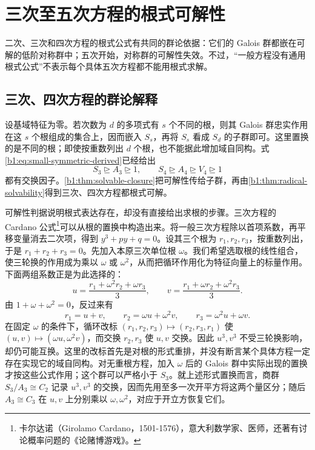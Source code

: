 
\section{三次至五次方程的根式可解性}
\label{b1:sec:2103}

二次、三次和四次方程的根式公式有共同的群论依据：它们的 Galois 群都嵌在可解的低阶对称群中；五次开始，对称群的可解性失效。不过，“一般方程没有通用根式公式”不表示每个具体五次方程都不能用根式求解。

%
%

\subsection{三次、四次方程的群论解释}
\label{b1:subsec:2103:01}

设基域特征为零。若次数为 \(d\) 的多项式有 \(s\) 个不同的根，则其 Galois 群忠实作用在这 \(s\) 个根组成的集合上，因而嵌入 \(S_s\)，再将 \(S_s\) 看成 \(S_d\) 的子群即可。这里置换的是不同的根；即使按重数列出 \(d\) 个根，也不能据此增加域自同构。式\eqref{b1:eq:small-symmetric-derived}已经给出
\[
	S_3\trianglerighteq A_3\trianglerighteq1, \qquad S_4\trianglerighteq A_4\trianglerighteq V_4\trianglerighteq1
\]
都有交换因子。\cref{b1:thm:solvable-closure}把可解性传给子群，再由\cref{b1:thm:radical-solvability}得到三次、四次方程都根式可解。

\ProseParagraphBreak
可解性判据说明根式表达存在，却没有直接给出求根的步骤。三次方程的 Cardano 公式\footnote{卡尔达诺（Girolamo Cardano，1501-1576），意大利数学家、医师，还著有讨论概率问题的《论赌博游戏》。}可以从根的置换中构造出来。将一般三次方程除以首项系数，再平移变量消去二次项，得到 \(y^3+py+q=0\)。设其三个根为 \(r_1,r_2,r_3\)，按重数列出，于是 \(r_1+r_2+r_3=0\)。先加入本原三次单位根 \(\omega\)。我们希望选取根的线性组合，使三轮换的作用成为乘以 \(\omega\) 或 \(\omega^2\)，从而把循环作用化为特征向量上的标量作用。下面两组系数正是为此选择的：
\[
	u=\frac{r_1+\omega^2r_2+\omega r_3}{3},\qquad v=\frac{r_1+\omega r_2+\omega^2r_3}{3}.
\]
由 \(1+\omega+\omega^2=0\)，反过来有
\[
	r_1=u+v,\qquad r_2=\omega u+\omega^2v,\qquad r_3=\omega^2u+\omega v.
\]
在固定 \(\omega\) 的条件下，循环改标 \((r_1,r_2,r_3)\mapsto(r_2,r_3,r_1)\) 使 \((u,v)\mapsto(\omega u,\omega^2v)\)，而交换 \(r_2,r_3\) 使 \(u,v\) 交换。因此 \(u^3,v^3\) 不受三轮换影响，却仍可能互换。这里的改标首先是对根的形式重排，并没有断言某个具体方程一定存在实现它的域自同构。对无重根方程，加入 \(\omega\) 后的 Galois 群中实际出现的置换才按这些公式作用；这个群可以严格小于 \(S_3\)。就上述形式置换而言，商群 \(S_3/A_3\cong C_2\) 记录 \(u^3,v^3\) 的交换，因而先用至多一次开平方将这两个量区分；随后 \(A_3\cong C_3\) 在 \(u,v\) 上分别乘以 \(\omega,\omega^2\)，对应于开立方恢复它们。

